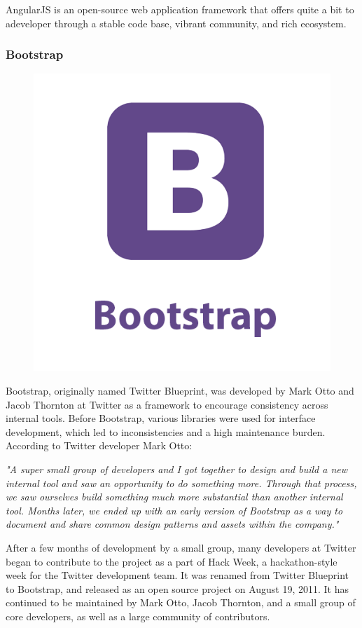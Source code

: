 AngularJS is an open-source web application framework that offers quite a bit to adeveloper  through  a  stable  code  base,  vibrant  community,  and  rich  ecosystem.


\subsubsection*{Bootstrap}
\begin{figure}[h]
	\centering
	\includegraphics[width=.5\linewidth]{images/bootstrap}
	\label{fig:bootstrap-logo}
\end{figure}
Bootstrap, originally named Twitter Blueprint, was developed by Mark Otto and Jacob Thornton at Twitter as a framework to encourage consistency across internal tools. Before Bootstrap, various libraries were used for interface development, which led to inconsistencies and a high maintenance burden. According to Twitter developer Mark Otto:
\newline

\textit{"A super small group of developers and I got together to design and build a new internal tool and saw an opportunity to do something more. Through that process, we saw ourselves build something much more substantial than another internal tool. Months later, we ended up with an early version of Bootstrap as a way to document and share common design patterns and assets within the company."}
\newline

After a few months of development by a small group, many developers at Twitter began to contribute to the project as a part of Hack Week, a hackathon-style week for the Twitter development team. It was renamed from Twitter Blueprint to Bootstrap, and released as an open source project on August 19, 2011. It has continued to be maintained by Mark Otto, Jacob Thornton, and a small group of core developers, as well as a large community of contributors.
\newline

